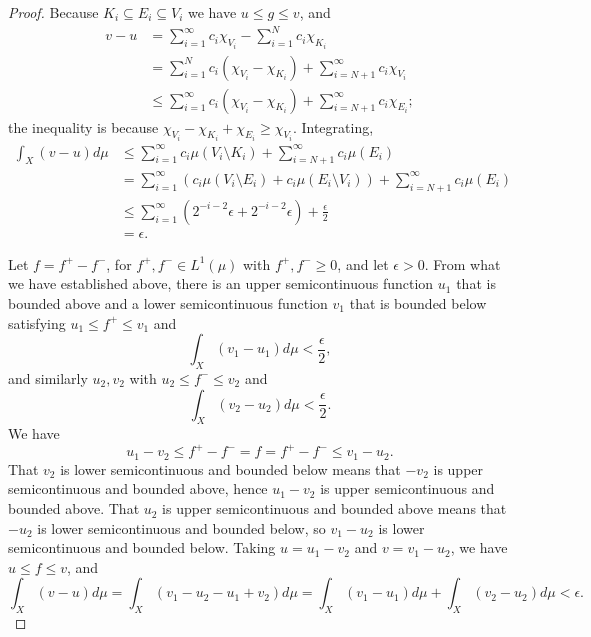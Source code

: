 \documentclass{article}
\theoremstyle{definition}
\begin{document}
\begin{proof}
Because $K_i \subseteq E_i \subseteq V_i$ we have $u \leq g \leq v$, and
\begin{align*}
v-u &= \sum_{i=1}^\infty c_i \chi_{V_i} - \sum_{i=1}^N c_i \chi_{K_i} \\
&= \sum_{i=1}^N c_i(\chi_{V_i}-\chi_{K_i}) + \sum_{i=N+1}^\infty c_i \chi_{V_i}\\
&\leq \sum_{i=1}^\infty c_i(\chi_{V_i}-\chi_{K_i}) + \sum_{i=N+1}^\infty c_i \chi_{E_i};
\end{align*}
the inequality is because $\chi_{V_i}-\chi_{K_i}+\chi_{E_i} \geq \chi_{V_i}$.
Integrating,
\begin{align*}
\int_X (v-u) d\mu& \leq \sum_{i=1}^\infty c_i \mu(V_i \setminus K_i) + \sum_{i=N+1}^\infty c_i \mu(E_i)\\
&= \sum_{i=1}^\infty (c_i \mu(V_i \setminus E_i)  + c_i \mu(E_i \setminus V_i)) + \sum_{i=N+1}^\infty c_i \mu(E_i)\\
&\leq \sum_{i=1}^\infty (2^{-i-2} \epsilon + 2^{-i-2}\epsilon) + \frac{\epsilon}{2}\\
&= \epsilon.
\end{align*}

Let $f=f^+ -f^-$, for $f^+,f^- \in L^1(\mu)$ with $f^+, f^- \geq 0$, and let $\epsilon>0$. From what we have established above, there is an upper semicontinuous function $u_1$ that is bounded
above and a lower semicontinuous function $v_1$ that is bounded below satisfying $u_1 \leq f^+ \leq v_1$ and
\[
\int_X (v_1-u_1) d\mu < \frac{\epsilon}{2},
\]
and similarly $u_2,v_2$ with $u_2 \leq f^- \leq v_2$ and
\[
\int_X (v_2-u_2) d\mu < \frac{\epsilon}{2}.
\]
We have
\[
u_1 - v_2 \leq f ^+ - f^- =f=f^+-f^- \leq v_1-u_2.
\]
That $v_2$ is lower semicontinuous and bounded below means that $-v_2$ is upper semicontinuous and bounded above, hence $u_1-v_2$ is upper semicontinuous
and bounded above. That $u_2$ is upper semicontinuous and bounded above means that $-u_2$ is lower semicontinuous and bounded below, so
$v_1-u_2$ is lower semicontinuous and bounded below. Taking $u=u_1-v_2$ and $v=v_1-u_2$,
we have $u \leq f \leq v$, and 
\[
\int_X (v-u) d\mu = \int_X (v_1-u_2-u_1+v_2) d\mu = \int_X (v_1-u_1) d\mu + \int_X (v_2-u_2) d\mu
<\epsilon.
\]
\end{proof}
\end{document}
